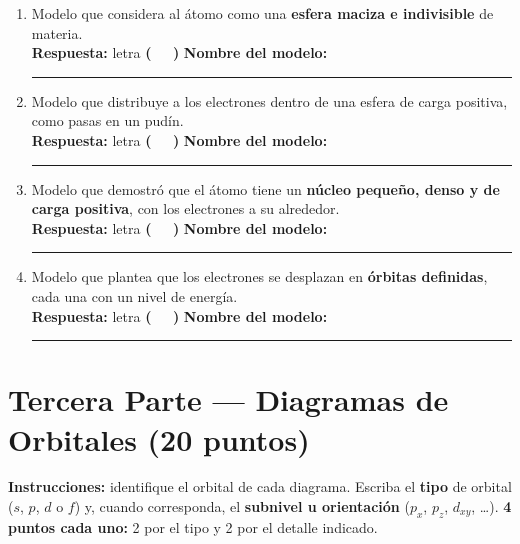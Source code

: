 \documentclass[12pt, letterpaper]{article}
\begin{document}
\vspace{6pt}
\begin{enumerate}[leftmargin=*]
  \item Modelo que considera al átomo como una \textbf{esfera maciza e indivisible} de materia. \\[2pt]
        \textbf{Respuesta:} letra \textbf{( \ \ )} \qquad \textbf{Nombre del modelo:} \rule{4.6cm}{0.4pt}

  \item Modelo que distribuye a los electrones dentro de una esfera de carga positiva, como pasas en un pudín. \\[2pt]
        \textbf{Respuesta:} letra \textbf{( \ \ )} \qquad \textbf{Nombre del modelo:} \rule{4.6cm}{0.4pt}

  \item Modelo que demostró que el átomo tiene un \textbf{núcleo pequeño, denso y de carga positiva}, con los electrones a su alrededor. \\[2pt]
        \textbf{Respuesta:} letra \textbf{( \ \ )} \qquad \textbf{Nombre del modelo:} \rule{4.6cm}{0.4pt}

  \item Modelo que plantea que los electrones se desplazan en \textbf{órbitas definidas}, cada una con un nivel de energía. \\[2pt]
        \textbf{Respuesta:} letra \textbf{( \ \ )} \qquad \textbf{Nombre del modelo:} \rule{4.6cm}{0.4pt}
\end{enumerate}

\newpage

\section*{Tercera Parte — Diagramas de Orbitales (20 puntos)}

\noindent\textbf{Instrucciones:} identifique el orbital de cada diagrama. Escriba el \textbf{tipo} de orbital ($s$, $p$, $d$ o $f$) y, cuando corresponda, el \textbf{subnivel u orientación} ($p_x$, $p_z$, $d_{xy}$, \ldots). \textbf{4 puntos cada uno:} 2 por el tipo y 2 por el detalle indicado.
\end{document}
